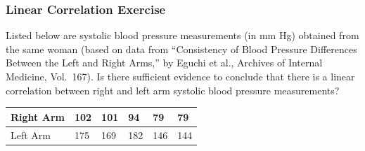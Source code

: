 \documentclass[xcolor=dvipsnames]{beamer}
\begin{document}
\begin{frame}
  \frametitle{Linear Correlation Exercise}
  Listed below are systolic blood pressure measurements (in mm Hg)
  obtained from the same woman (based on data from ``Consistency of
  Blood Pressure Differences Between the Left and Right Arms,'' by
  Eguchi et al., Archives of Internal Medicine, Vol.\ 167). Is there
  sufficient evidence to conclude that there is a linear correlation
  between right and left arm systolic blood pressure measurements?


\bigskip

\begin{tabular}{|l|l|l|l|l|l|}
\hline
Right Arm & 102 & 101 & 94 & 79 & 79 \\
\hline
Left Arm & 175 & 169 & 182 & 146 & 144 \\
\hline
\end{tabular}

\end{frame}
\end{document}
